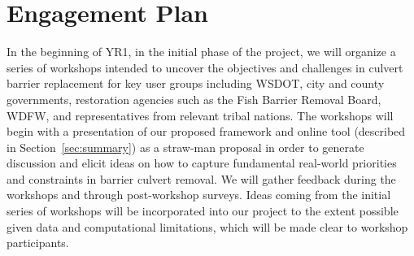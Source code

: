 \documentclass[12pt]{elsarticle}
\begin{document}

\section{Engagement Plan}\label{sec:engage} %

In the beginning of YR1, in the initial phase of the project, we will organize a series of workshops intended to uncover the objectives and challenges in culvert barrier replacement for key user groups including WSDOT, city and county governments, restoration agencies such as the Fish Barrier Removal Board, WDFW, and representatives from relevant tribal nations. The workshops will begin with a presentation of our proposed framework and online tool (described in Section~\ref{sec:summary}) as a straw-man proposal in order to generate discussion and elicit ideas on how to capture fundamental real-world priorities and constraints in barrier culvert removal. We will gather feedback during the workshops and through post-workshop surveys. Ideas coming from the initial series of workshops will be incorporated into our project to the extent possible given data and computational limitations, which will be made clear to workshop participants.
\end{document}
